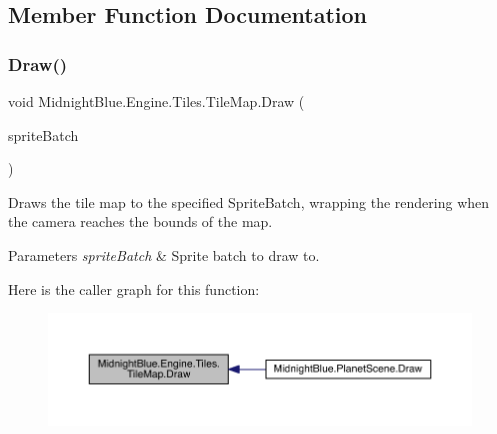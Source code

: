 \subsection{Member Function Documentation}
\hypertarget{class_midnight_blue_1_1_engine_1_1_tiles_1_1_tile_map_a5114eb9087f448be67b146f40245e7ee}{}\label{class_midnight_blue_1_1_engine_1_1_tiles_1_1_tile_map_a5114eb9087f448be67b146f40245e7ee} 
\subsubsection{\texorpdfstring{Draw()}{Draw()}}
{\footnotesize\ttfamily void Midnight\+Blue.\+Engine.\+Tiles.\+Tile\+Map.\+Draw (\begin{DoxyParamCaption}\item[{Sprite\+Batch}]{sprite\+Batch }\end{DoxyParamCaption})\hspace{0.3cm}{\ttfamily [inline]}}



Draws the tile map to the specified Sprite\+Batch, wrapping the rendering when the camera reaches the bounds of the map. 


\begin{DoxyParams}{Parameters}
{\em sprite\+Batch} & Sprite batch to draw to.\\
\hline
\end{DoxyParams}
Here is the caller graph for this function\+:
\nopagebreak
\begin{figure}[H]
\begin{center}
\leavevmode
\includegraphics[width=350pt]{class_midnight_blue_1_1_engine_1_1_tiles_1_1_tile_map_a5114eb9087f448be67b146f40245e7ee_icgraph}
\end{center}
\end{figure}
\hypertarget{class_midnight_blue_1_1_engine_1_1_tiles_1_1_tile_map_ab2ae5b8ef2fb44d5267b8be7997ddb4c}{}\label{class_midnight_blue_1_1_engine_1_1_tiles_1_1_tile_map_ab2ae5b8ef2fb44d5267b8be7997ddb4c} 
